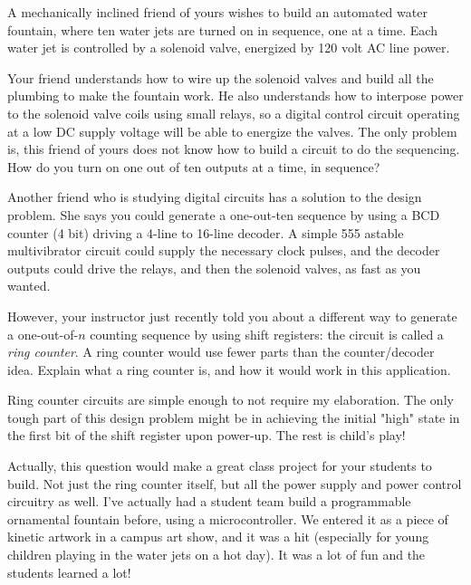 

A mechanically inclined friend of yours wishes to build an automated water fountain, where ten water jets are turned on in sequence, one at a time.  Each water jet is controlled by a solenoid valve, energized by 120 volt AC line power.

Your friend understands how to wire up the solenoid valves and build all the plumbing to make the fountain work.  He also understands how to interpose power to the solenoid valve coils using small relays, so a digital control circuit operating at a low DC supply voltage will be able to energize the valves.  The only problem is, this friend of yours does not know how to build a circuit to do the sequencing.  How do you turn on one out of ten outputs at a time, in sequence?

Another friend who is studying digital circuits has a solution to the design problem.  She says you could generate a one-out-ten sequence by using a BCD counter (4 bit) driving a 4-line to 16-line decoder.  A simple 555 astable multivibrator circuit could supply the necessary clock pulses, and the decoder outputs could drive the relays, and then the solenoid valves, as fast as you wanted.

However, your instructor just recently told you about a different way to generate a one-out-of-$n$ counting sequence by using shift registers: the circuit is called a {\it ring counter}.  A ring counter would use fewer parts than the counter/decoder idea.  Explain what a ring counter is, and how it would work in this application.







Ring counter circuits are simple enough to not require my elaboration.  The only tough part of this design problem might be in achieving the initial "high" state in the first bit of the shift register upon power-up.  The rest is child's play!







Actually, this question would make a great class project for your students to build.  Not just the ring counter itself, but all the power supply and power control circuitry as well.  I've actually had a student team build a programmable ornamental fountain before, using a microcontroller.  We entered it as a piece of kinetic artwork in a campus art show, and it was a hit (especially for young children playing in the water jets on a hot day).  It was a lot of fun and the students learned a lot!




